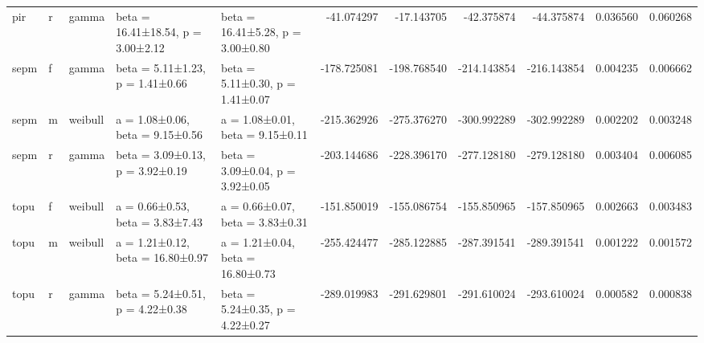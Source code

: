 \begin{tabular}{lllllrrrrrr}
pir & r & gamma & beta = 16.41±18.54, p = 3.00±2.12 & beta = 16.41±5.28, p = 3.00±0.80 & -41.074297 & -17.143705 & -42.375874 & -44.375874 & 0.036560 & 0.060268 \\
sepm & f & gamma & beta = 5.11±1.23, p = 1.41±0.66 & beta = 5.11±0.30, p = 1.41±0.07 & -178.725081 & -198.768540 & -214.143854 & -216.143854 & 0.004235 & 0.006662 \\
sepm & m & weibull & a = 1.08±0.06, beta = 9.15±0.56 & a = 1.08±0.01, beta = 9.15±0.11 & -215.362926 & -275.376270 & -300.992289 & -302.992289 & 0.002202 & 0.003248 \\
sepm & r & gamma & beta = 3.09±0.13, p = 3.92±0.19 & beta = 3.09±0.04, p = 3.92±0.05 & -203.144686 & -228.396170 & -277.128180 & -279.128180 & 0.003404 & 0.006085 \\
topu & f & weibull & a = 0.66±0.53, beta = 3.83±7.43 & a = 0.66±0.07, beta = 3.83±0.31 & -151.850019 & -155.086754 & -155.850965 & -157.850965 & 0.002663 & 0.003483 \\
topu & m & weibull & a = 1.21±0.12, beta = 16.80±0.97 & a = 1.21±0.04, beta = 16.80±0.73 & -255.424477 & -285.122885 & -287.391541 & -289.391541 & 0.001222 & 0.001572 \\
topu & r & gamma & beta = 5.24±0.51, p = 4.22±0.38 & beta = 5.24±0.35, p = 4.22±0.27 & -289.019983 & -291.629801 & -291.610024 & -293.610024 & 0.000582 & 0.000838 \\
\bottomrule
\end{tabular}
